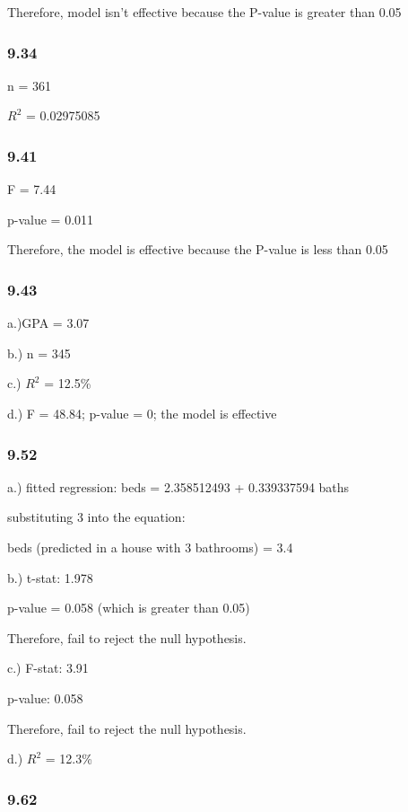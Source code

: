 \documentclass[
]{article}
\begin{document}
Therefore, model isn't effective because the P-value is greater than
0.05

\hypertarget{section-7}{%
\subsubsection{9.34}\label{section-7}}

n = 361

\(R^2\) = 0.02975085

\hypertarget{section-8}{%
\subsubsection{9.41}\label{section-8}}

F = 7.44

p-value = 0.011

Therefore, the model is effective because the P-value is less than 0.05

\hypertarget{section-9}{%
\subsubsection{9.43}\label{section-9}}

a.)GPA = 3.07

b.) n = 345

c.) \(R^2\) = 12.5\%

d.) F = 48.84; p-value = 0; the model is effective

\hypertarget{section-10}{%
\subsubsection{9.52}\label{section-10}}

a.) fitted regression: beds = 2.358512493 + 0.339337594 baths

substituting 3 into the equation:

beds (predicted in a house with 3 bathrooms) = 3.4

b.) t-stat: 1.978

p-value = 0.058 (which is greater than 0.05)

Therefore, fail to reject the null hypothesis.

c.) F-stat: 3.91

p-value: 0.058

Therefore, fail to reject the null hypothesis.

d.) \(R^2\) = 12.3\%

\hypertarget{section-11}{%
\subsubsection{9.62}\label{section-11}}
\end{document}
